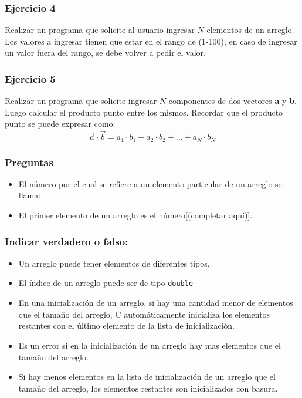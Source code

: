 \subsubsection{Ejercicio 4} 
Realizar un programa que solicite al usuario ingresar $N$ elementos de un arreglo. Los valores a ingresar tienen que estar en el rango de (1-100), en caso de ingresar un valor fuera del rango, se debe volver a pedir el valor.
{\small
  \lstset{inputencoding=utf8/latin1}
  
}
\subsubsection{Ejercicio 5} 
Realizar un programa que solicite ingresar $N$ componentes de dos vectores \textbf{a} y \textbf{b}. Luego calcular el producto punto entre los mismos.
Recordar que el producto punto se puede expresar como:
$$\overrightarrow{a}\cdot \overrightarrow{b} = a_1\cdot b_1 + a_2\cdot b_2 +\dots + a_N\cdot b_N$$
{\small
  \lstset{inputencoding=utf8/latin1}
  
}

\subsubsection{Preguntas} 
\begin{itemize}
  \item El número por el cual se refiere a un elemento particular de un arreglo se llama:
  \item El primer elemento de un arreglo es el número[(completar aquí)].
\end{itemize}

\subsubsection{Indicar verdadero o falso:}
\begin{itemize}
  \item Un arreglo puede tener elementos de diferentes tipos.
  \item El índice de un arreglo puede ser de tipo \texttt{double}
  \item En una inicialización de un arreglo, si hay una cantidad menor de elementos que el tamaño del arreglo, C automáticamente inicializa los elementos restantes con el último elemento de la lista de inicialización.
  \item Es un error si en la inicialización de un arreglo hay mas elementos que el tamaño del arreglo.
  \item Si hay menos elementos en la lista de inicialización de un arreglo que el tamaño del arreglo, los elementos restantes son inicializados con basura.
\end{itemize}

